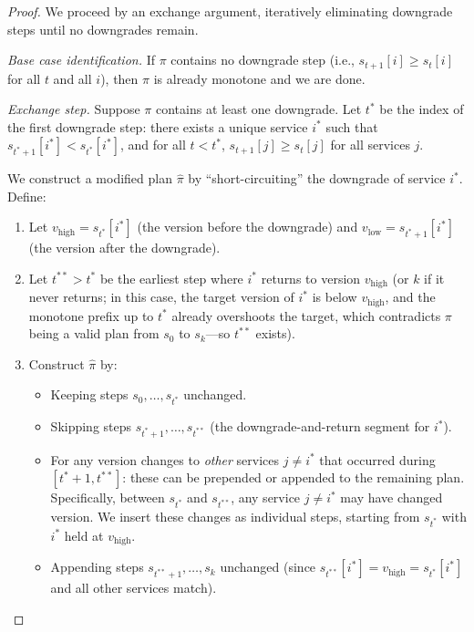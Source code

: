 \documentclass[10pt,twocolumn]{article}
\begin{document}
\begin{proof}
We proceed by an exchange argument, iteratively eliminating downgrade steps until no downgrades remain.

\emph{Base case identification.} If $\pi$ contains no downgrade step (i.e., $s_{t+1}[i] \geq s_t[i]$ for all $t$ and all $i$), then $\pi$ is already monotone and we are done.

\emph{Exchange step.} Suppose $\pi$ contains at least one downgrade. Let $t^*$ be the index of the first downgrade step: there exists a unique service $i^*$ such that $s_{t^*+1}[i^*] < s_{t^*}[i^*]$, and for all $t < t^*$, $s_{t+1}[j] \geq s_t[j]$ for all services $j$.

We construct a modified plan $\hat{\pi}$ by ``short-circuiting'' the downgrade of service $i^*$. Define:
\begin{enumerate}
\item Let $v_{\mathrm{high}} = s_{t^*}[i^*]$ (the version before the downgrade) and $v_{\mathrm{low}} = s_{t^*+1}[i^*]$ (the version after the downgrade).
\item Let $t^{**} > t^*$ be the earliest step where $i^*$ returns to version $v_{\mathrm{high}}$ (or $k$ if it never returns; in this case, the target version of $i^*$ is below $v_{\mathrm{high}}$, and the monotone prefix up to $t^*$ already overshoots the target, which contradicts $\pi$ being a valid plan from $s_0$ to $s_k$---so $t^{**}$ exists).
\item Construct $\hat{\pi}$ by:
  \begin{itemize}
  \item Keeping steps $s_0, \ldots, s_{t^*}$ unchanged.
  \item Skipping steps $s_{t^*+1}, \ldots, s_{t^{**}}$ (the downgrade-and-return segment for $i^*$).
  \item For any version changes to \emph{other} services $j \neq i^*$ that occurred during $[t^*+1, t^{**}]$: these can be prepended or appended to the remaining plan. Specifically, between $s_{t^*}$ and $s_{t^{**}}$, any service $j \neq i^*$ may have changed version. We insert these changes as individual steps, starting from $s_{t^*}$ with $i^*$ held at $v_{\mathrm{high}}$.
  \item Appending steps $s_{t^{**}+1}, \ldots, s_k$ unchanged (since $s_{t^{**}}[i^*] = v_{\mathrm{high}} = s_{t^*}[i^*]$ and all other services match).
  \end{itemize}
\end{enumerate}


\end{proof}
\end{document}
